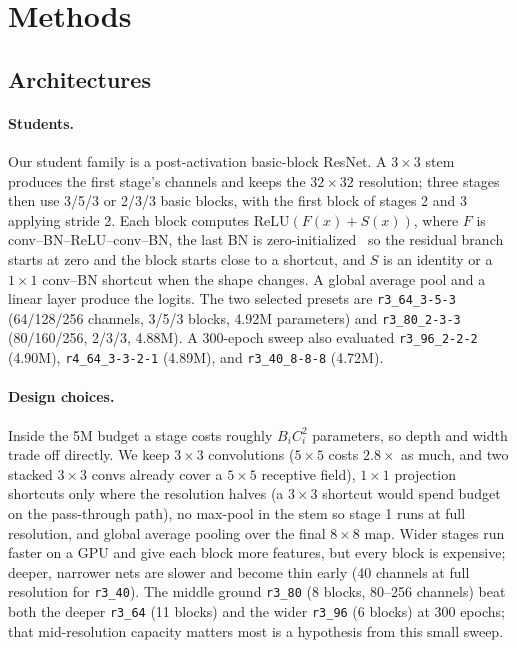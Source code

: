 \section{Methods}
\label{sec:method}

\subsection{Architectures}

\paragraph{Students.}
Our student family is a post-activation basic-block ResNet. A $3\times3$ stem
produces the first stage's channels and keeps the $32\times32$ resolution; three
stages then use 3/5/3 or 2/3/3 basic blocks, with the first block of stages 2 and
3 applying stride 2. Each block computes
$\mathrm{ReLU}(F(x)+S(x))$, where $F$ is conv--BN--ReLU--conv--BN, the last BN is
zero-initialized~\citep{goyal2017} so the residual branch starts at zero and the block starts close
to a shortcut, and $S$ is an identity or a
$1\times1$ conv--BN shortcut when the shape changes. A global average pool and a
linear layer produce the logits. The two selected presets are
\texttt{r3\_64\_3-5-3} (64/128/256 channels, 3/5/3 blocks, 4.92M parameters) and
\texttt{r3\_80\_2-3-3} (80/160/256, 2/3/3, 4.88M). A 300-epoch sweep also
evaluated \texttt{r3\_96\_2-2-2} (4.90M), \texttt{r4\_64\_3-3-2-1} (4.89M), and
\texttt{r3\_40\_8-8-8} (4.72M).

\paragraph{Design choices.}
Inside the 5M budget a stage costs roughly $B_i C_i^2$ parameters, so depth and
width trade off directly. We keep $3\times3$ convolutions ($5\times5$ costs
$2.8\times$ as much, and two stacked $3\times3$ convs already cover a
$5\times5$ receptive field), $1\times1$ projection shortcuts only where the
resolution halves (a $3\times3$ shortcut would spend budget on the pass-through
path), no max-pool in the stem so stage 1 runs at full resolution, and global
average pooling over the final $8\times8$ map. Wider stages run faster on a GPU
and give each block more features, but every block is expensive; deeper,
narrower nets are slower and become thin early (40 channels at full resolution
for \texttt{r3\_40}). The middle ground \texttt{r3\_80} (8 blocks,
80--256 channels) beat both the deeper \texttt{r3\_64} (11 blocks) and the
wider \texttt{r3\_96} (6 blocks) at 300 epochs; that mid-resolution capacity
matters most is a hypothesis from this small sweep.

